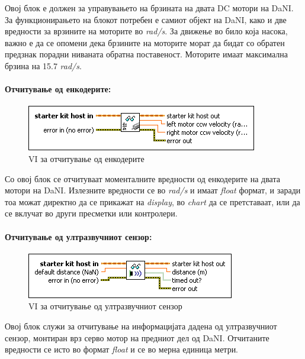 \documentclass{article}
\begin{document}
Овој блок е должен за управувањето на брзината на двата DC мотори на DaNI. За функционирањето на блокот потребен е самиот објект на DaNI, како и две вредности за врзините на моторите во \textit{rad/s}. За движење во било која насока, важно е да се опомени дека брзините на моторите морат да бидат со обратен предзнак порадни ниваната обратна поставеност. Моторите имаат максимална брзина на 15.7 \textit{rad/s}.

\paragraph{Отчитување од енкодерите:\\}
\begin{figure}[h]
\includegraphics[width=0.45\linewidth]{read_dc.png}
\raggedright
\caption{VI за отчитување од енкодерите}
\label{fig:read_dc.png}
\end{figure}

Со овој блок се отчитуваат моменталните вредности од енкодерите на двата мотори на DaNI. Излезните вредности се во \textit{rad/s} и  имаат \textit{float} формат, и заради тоа можат директно да се прикажат на \textit{display}, во \textit{chart} да се претставаат, или да се вклучат во други пресметки или контролери.

\paragraph{Отчитување од ултразвучниот сензор:\\}
\begin{figure}[h]
\includegraphics[width=0.45\linewidth]{read_ping.png}
\raggedright
\caption{VI за отчитување од ултразвучниот сензор}
\label{fig:read_ping.png}
\end{figure}

Овој блок служи за отчитување на информацијата дадена од ултразвучниот сензор, монтиран врз серво мотор на предниот дел од DaNI. Отчитаните вредности се исто во формат \textit{float} и се во мерна единица метри.
\end{document}
